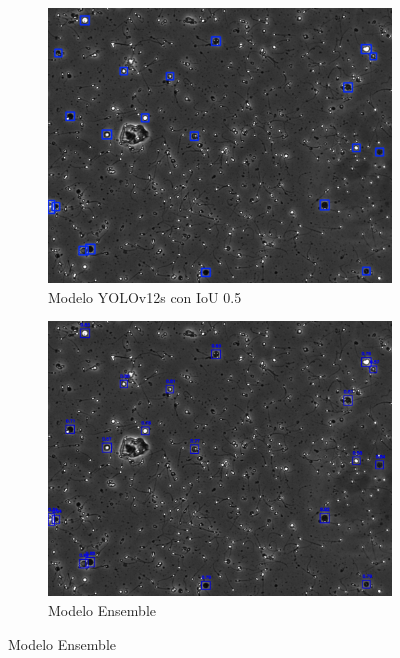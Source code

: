 \documentclass[12pt,a4paper,onecolumn,oneside]{report}
\begin{document}
\begin{figure}[H]
  \vspace{0.3cm} 
  
  \begin{subfigure}[b]{0.48\textwidth}
    \centering
    \includegraphics[width=\textwidth]{figuras/evaluacion_cualitativa/415/415_v12.jpg}
    \caption{Modelo YOLOv12s con IoU 0.5}
    \label{fig:yolov12s_IoU0.5_image_415}
  \end{subfigure}
  \hfill
  \begin{subfigure}[b]{0.48\textwidth}
    \centering
    \includegraphics[width=\textwidth]{figuras/evaluacion_cualitativa/415/415_ensemble.jpg}
    \caption{Modelo Ensemble}
    \label{fig:ensemble_image_415}
  \end{subfigure}


\end{figure}
\end{document}
